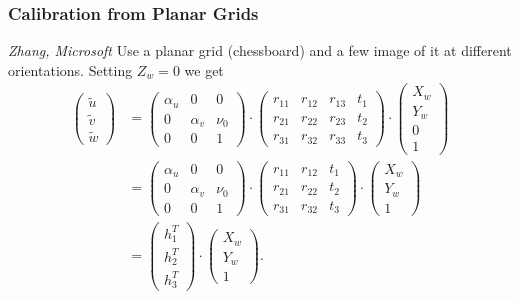 \documentclass[a4paper,12 pt]{article}
\theoremstyle{definition}
\theoremstyle{remark}
\theoremstyle{definition}
\theoremstyle{definition}
\theoremstyle{definition}
\theoremstyle{remark}
\theoremstyle{definition}
\begin{document}
\subsubsection*{Calibration from Planar Grids}
\textit{Zhang, Microsoft} Use a planar grid (chessboard) and a few image of it at different orientations. Setting $Z_w=0$ we get
\begin{equation}
\begin{split}
\begin{pmatrix}
\tilde{u}\\
\tilde{v}\\
\tilde{w}
\end{pmatrix} &=\begin{pmatrix}
\alpha_u &0&0\\
0&\alpha_v &\nu_0\\
0&0&1
\end{pmatrix}\cdot \begin{pmatrix}
 r_{11}&r_{12}&r_{13}&t_1\\
 r_{21}&r_{22}&r_{23}&t_2\\
 r_{31}&r_{32}&r_{33}&t_3
 \end{pmatrix}\cdot \begin{pmatrix}
 X_w\\
 Y_w\\
0\\
 1
 \end{pmatrix}\\
 &=\begin{pmatrix}
\alpha_u &0&0\\
0&\alpha_v &\nu_0\\
0&0&1
\end{pmatrix}\cdot \begin{pmatrix}
 r_{11}&r_{12}&t_1\\
 r_{21}&r_{22}&t_2\\
 r_{31}&r_{32}&t_3
 \end{pmatrix}\cdot \begin{pmatrix}
 X_w\\
 Y_w\\
 1
 \end{pmatrix}\\
 &=\begin{pmatrix}
h_1^T\\
h_2^T\\
h_3^T
\end{pmatrix}\cdot \begin{pmatrix}
 X_w\\
 Y_w\\
 1
 \end{pmatrix}.
\end{split}
\end{equation}
\end{document}
